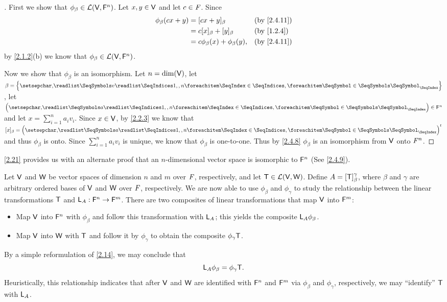 \begin{proof}[]
	First we show that \(\phi_{\beta} \in \mathcal{L}(\mathsf{V}, \mathsf{F}^n)\).
	Let \(x, y \in \mathsf{V}\) and let \(c \in \mathit{F}\).
	Since
	\begin{align*}
		\phi_{\beta}(cx + y) & = [cx + y]_{\beta}                     &  & \by{2.4.11} \\
		                     & = c [x]_{\beta} + [y]_{\beta}          &  & \by{1.2.4}  \\
		                     & = c \phi_{\beta}(x) + \phi_{\beta}(y), &  & \by{2.4.11}
	\end{align*}
	by \cref{2.1.2}(b) we know that \(\phi_{\beta} \in \mathcal{L}(\mathsf{V}, \mathsf{F}^n)\).

	Now we show that \(\phi_{\beta}\) is an isomorphism.
	Let \(n = \dim(\mathsf{V})\), let \(\beta = \set{\seq{v}{1,,n}}\), let \(\tuple{a}{1,,n} \in \vs{F}^n\) and let \(x = \sum_{i = 1}^n a_i v_i\).
	Since \(x \in \mathsf{V}\), by \cref{2.2.3} we know that \([x]_{\beta} = \tp{\tuple{a}{1,,n}}\) and thus \(\phi_{\beta}\) is onto.
	Since \(\sum_{i = 1}^n a_i v_i\) is unique, we know that \(\phi_{\beta}\) is one-to-one.
	Thus by \cref{2.4.8} \(\phi_{\beta}\) is an isomorphism from \(\mathsf{V}\) onto \(\mathsf{\mathit{F}}^n\).
\end{proof}

\begin{note}
	\cref{2.21} provides us with an alternate proof that an \(n\)-dimensional vector space is isomorphic to \(\mathsf{F}^n\)
	(See \cref{2.4.9}).
\end{note}

\begin{cor}\label{2.4.12}
	Let \(\mathsf{V}\) and \(\mathsf{W}\) be vector spaces of dimension \(n\) and \(m\) over \(\mathit{F}\), respectively, and let \(\mathsf{T} \in \mathcal{L}(\mathsf{V}, \mathsf{W})\).
	Define \(A = [\mathsf{T}]_{\beta}^{\gamma}\), where \(\beta\) and \(\gamma\) are arbitrary ordered bases of \(\mathsf{V}\) and \(\mathsf{W}\) over \(\mathit{F}\), respectively.
	We are now able to use \(\phi_{\beta}\) and \(\phi_{\gamma}\) to study the relationship between the linear transformations \(\mathsf{T}\) and \(\mathsf{L}_A : \mathsf{F}^n \to \mathsf{F}^m\).
	There are two composites of linear transformations that map \(\mathsf{V}\) into \(\mathsf{F}^m\):
	\begin{itemize}
		\item Map \(\mathsf{V}\) into \(\mathsf{F}^n\) with \(\phi_{\beta}\) and follow this transformation with \(\mathsf{L}_A\);
		      this yields the composite \(\mathsf{L}_A \phi_{\beta}\).
		\item Map \(\mathsf{V}\) into \(\mathsf{W}\) with \(\mathsf{T}\) and follow it by \(\phi_{\gamma}\) to obtain the composite \(\phi_{\gamma} \mathsf{T}\).
	\end{itemize}
	By a simple reformulation of \cref{2.14}, we may conclude that
	\[
		\mathsf{L}_A \phi_{\beta} = \phi_{\gamma} \mathsf{T}.
	\]
	Heuristically, this relationship indicates that after \(\mathsf{V}\) and \(\mathsf{W}\) are identified with \(\mathsf{F}^n\) and \(\mathsf{F}^m\) via \(\phi_{\beta}\) and \(\phi_{\gamma}\), respectively, we may ``identify'' \(\mathsf{T}\) with \(\mathsf{L}_A\).
\end{cor}

